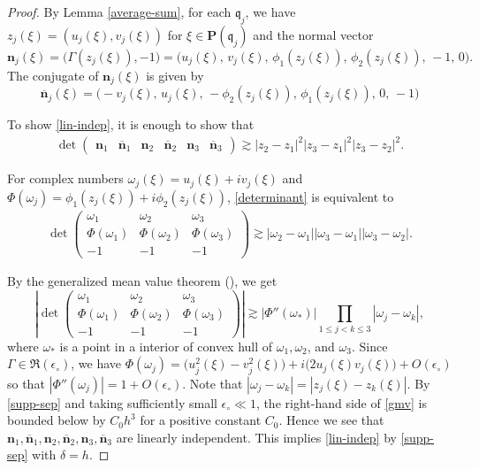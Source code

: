 \documentclass[10pt] %
{amsart}
\theoremstyle{plain}
\numberwithin{equation}{section}
\newcommand{\fq}{\mathfrak q}
\begin{document}
\begin{proof}
By Lemma \ref{average-sum}, for each $\fq_j$, we have $z_j(\xi)= (u_j(\xi), v_j(\xi))$ for $\xi \in \mathbf P(\fq_j)$ and the normal vector
\[
\mathbf n_j (\xi)   =\big( \Gamma( z_j(\xi)), -1 \big) = \big( u_j(\xi), \, v_j(\xi), \, \phi_1(z_j(\xi)),\, \phi_2( z_j(\xi)), \,-1, \,0 \big)   . 
\]
The conjugate of $\mathbf n_j(\xi)$ is given by 
\[
\overline{\mathbf n}_j (\xi) = \big( -v_j (\xi), \,u_j(\xi), \, -\phi_2(z_j(\xi)),\,  \phi_1( z_j(\xi)), \,0, \,-1 \big) 
\]


To show \eqref{lin-indep}, it is enough to show that
\begin{align}\label{determinant} 
\det \begin{pmatrix} \mathbf n_1 & \overline{\mathbf n}_1 & \mathbf n_2 & \overline{\mathbf n}_2  & \mathbf n_3 & \overline{\mathbf n}_3\end{pmatrix}   \gtrsim |z_2 - z_1 |^2 |z_3-z_1|^2 |z_3-z_2|^2   . 
\end{align}

 

For  complex numbers $\omega_j (\xi) = u_j(\xi) + i v_j(\xi)$ and $\Phi (\omega_j) = \phi_1(z_j(\xi)) + i \phi_2(z_j(\xi))$,  
\eqref{determinant} is equivalent to 
\begin{align*} 
\det \begin{pmatrix} \omega_1 & \omega_2 & \omega_3  \\ \Phi(\omega_1) &\Phi(\omega_2) & \Phi(\omega_3) \\ -1 & -1 & -1 \end{pmatrix} \gtrsim |\omega_2 -\omega_1| |\omega_3 -\omega_1||\omega_3 -\omega_2| .
\end{align*}

By the generalized mean value theorem (\cite[part V, Problem 95]{PS}), we get
\begin{equation}\label{gmv}
\left|  \det \begin{pmatrix} \omega_1 & \omega_2 & \omega_3  \\ \Phi(\omega_1) &\Phi(\omega_2) & \Phi(\omega_3) \\ -1 & -1 & -1 \end{pmatrix} \right|  \gtrsim |\Phi''(\omega_\ast)| \prod_{1\le j< k \le 3} |\omega_j - \omega_k|,
\end{equation}
where $\omega_\ast$ is a point in a interior of convex hull of $\omega_1,\omega_2$, and $\omega_3$. 
Since $\Gamma \in \mathfrak R(\epsilon_\circ)$, we have $\Phi(\omega_j) = \big(u_j^2(\xi) - v_j^2(\xi)\big) + i \big(2 u_j(\xi) v_j(\xi)\big) + O(\epsilon_\circ)$ so that $|\Phi''(\omega_j)| = 1 + O(\epsilon_\circ)$. 
Note that $|\omega_j - \omega_k| = |z_j(\xi) - z_k(\xi)| $. 
By \eqref{supp-sep} and taking sufficiently small $\epsilon_\circ \ll 1$, the right-hand side of \eqref{gmv} is bounded below by $C_0 h^3$ for a positive constant $C_0$. 
Hence we see that $\mathbf n_1, \overline{\mathbf n}_1, \mathbf n_2,\overline{\mathbf n}_2 , \mathbf n_3,\overline{\mathbf n}_3$ are linearly independent. 
This implies \eqref{lin-indep} by \eqref{supp-sep} with $\delta =h$.
\end{proof}
\end{document}
